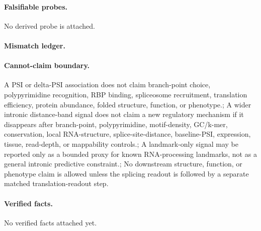 \paragraph{Falsifiable probes.}
No derived probe is attached.

\paragraph{Mismatch ledger.}
\paragraph{Cannot-claim boundary.} A PSI or delta-PSI association does not claim branch-point choice, polypyrimidine recognition, RBP binding, spliceosome recruitment, translation efficiency, protein abundance, folded structure, function, or phenotype.; A wider intronic distance-band signal does not claim a new regulatory mechanism if it disappears after branch-point, polypyrimidine, motif-density, GC/k-mer, conservation, local RNA-structure, splice-site-distance, baseline-PSI, expression, tissue, read-depth, or mappability controls.; A landmark-only signal may be reported only as a bounded proxy for known RNA-processing landmarks, not as a general intronic predictive constraint.; No downstream structure, function, or phenotype claim is allowed unless the splicing readout is followed by a separate matched translation-readout step.

\paragraph{Verified facts.}
No verified facts attached yet.
